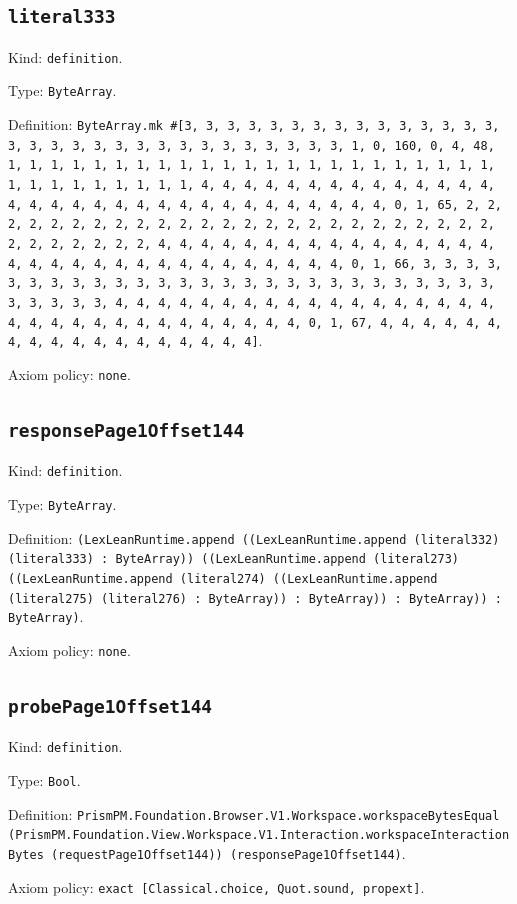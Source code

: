 \documentclass[11pt]{article}
\begin{document}
\subsection*{\texttt{literal333}}
\noindent Kind: \texttt{definition}.\par
\noindent Type: \texttt{ByteArray}.\par
\noindent Definition: \texttt{ByteArray.mk \#[3, 3, 3, 3, 3, 3, 3, 3, 3, 3, 3, 3, 3, 3, 3, 3, 3, 3, 3, 3, 3, 3, 3, 3, 3, 3, 3, 3, 3, 3, 3, 1, 0, 160, 0, 4, 48, 1, 1, 1, 1, 1, 1, 1, 1, 1, 1, 1, 1, 1, 1, 1, 1, 1, 1, 1, 1, 1, 1, 1, 1, 1, 1, 1, 1, 1, 1, 1, 1, 4, 4, 4, 4, 4, 4, 4, 4, 4, 4, 4, 4, 4, 4, 4, 4, 4, 4, 4, 4, 4, 4, 4, 4, 4, 4, 4, 4, 4, 4, 4, 4, 0, 1, 65, 2, 2, 2, 2, 2, 2, 2, 2, 2, 2, 2, 2, 2, 2, 2, 2, 2, 2, 2, 2, 2, 2, 2, 2, 2, 2, 2, 2, 2, 2, 2, 2, 4, 4, 4, 4, 4, 4, 4, 4, 4, 4, 4, 4, 4, 4, 4, 4, 4, 4, 4, 4, 4, 4, 4, 4, 4, 4, 4, 4, 4, 4, 4, 4, 0, 1, 66, 3, 3, 3, 3, 3, 3, 3, 3, 3, 3, 3, 3, 3, 3, 3, 3, 3, 3, 3, 3, 3, 3, 3, 3, 3, 3, 3, 3, 3, 3, 3, 3, 4, 4, 4, 4, 4, 4, 4, 4, 4, 4, 4, 4, 4, 4, 4, 4, 4, 4, 4, 4, 4, 4, 4, 4, 4, 4, 4, 4, 4, 4, 4, 4, 0, 1, 67, 4, 4, 4, 4, 4, 4, 4, 4, 4, 4, 4, 4, 4, 4, 4, 4, 4, 4]}.\par
\noindent Axiom policy: \texttt{none}.\par
\subsection*{\texttt{responsePage1Offset144}}
\noindent Kind: \texttt{definition}.\par
\noindent Type: \texttt{ByteArray}.\par
\noindent Definition: \texttt{(LexLeanRuntime.append ((LexLeanRuntime.append (literal332) (literal333) : ByteArray)) ((LexLeanRuntime.append (literal273) ((LexLeanRuntime.append (literal274) ((LexLeanRuntime.append (literal275) (literal276) : ByteArray)) : ByteArray)) : ByteArray)) : ByteArray)}.\par
\noindent Axiom policy: \texttt{none}.\par
\subsection*{\texttt{probePage1Offset144}}
\noindent Kind: \texttt{definition}.\par
\noindent Type: \texttt{Bool}.\par
\noindent Definition: \texttt{PrismPM.Foundation.Browser.V1.Workspace.workspaceBytesEqual (PrismPM.Foundation.View.Workspace.V1.Interaction.workspaceInteractionBytes (requestPage1Offset144)) (responsePage1Offset144)}.\par
\noindent Axiom policy: \texttt{exact [Classical.choice, Quot.sound, propext]}.\par
\end{document}
